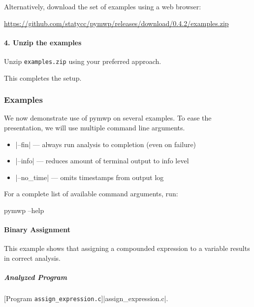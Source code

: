Alternatively, download the set of examples using a web browser:

\url{https://github.com/statycc/pymwp/releases/download/0.4.2/examples.zip}

\paragraph*{4. Unzip the examples}
Unzip \texttt{examples.zip} using your preferred approach.

This completes the setup.

\subsubsection{Examples}\label{guide-examples}

We now demonstrate use of pymwp on several examples.
To ease the presentation, we will use multiple command line arguments.

\begin{itemize}
\item \pr|--fin| --- always run analysis to completion (even on failure)
\item \pr|--info| --- reduces amount of terminal output to info level
\item \pr|--no_time| --- omits timestamps from output log
\end{itemize}

For a complete list of available command arguments, run:

\begin{center}
\begin{minipage}{\textwidth}
\begin{cmdlisting}[label={lst:help-cmd}]
pymwp --help
\end{cmdlisting}
\end{minipage}
\end{center}

\paragraph{Binary Assignment}\label{binary-assignment}
This example shows that assigning a compounded expression to a variable results in correct analysis.

\subparagraph*{Analyzed Program}

\begin{center}
\begin{minipage}{\textwidth}
\captionsetup{type=lstlisting}
[Program \texttt{assign\_expression.c}]{\pr|assign\_expression.c|.}
\label{lst:assgn_exp}
\end{minipage}
\end{center}

